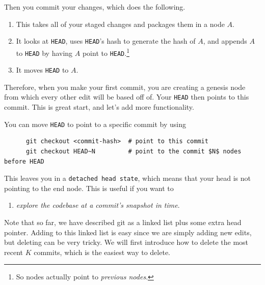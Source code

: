   \begin{definition}[Commit]
    Then you commit your changes, which does the following. 
    \begin{enumerate}
      \item This takes all of your staged changes and packages them in a node $A$. 
      \item It looks at \texttt{HEAD}, uses \texttt{HEAD}'s hash to generate the hash of $A$, and appends $A$ to \texttt{HEAD} by having $A$ point to \texttt{HEAD}.\footnote{So nodes actually point to \textit{previous nodes}.}
      \item It moves \texttt{HEAD} to $A$. 
    \end{enumerate}
  \end{definition} 

  Therefore, when you make your first commit, you are creating a genesis node from which every other edit will be based off of. Your \texttt{HEAD} then points to this commit. This is great start, and let's add more functionality. 

  \begin{definition}
    You can move \texttt{HEAD} to point to a specific commit by using 
    \begin{lstlisting}
      git checkout <commit-hash>  # point to this commit  
      git checkout HEAD~N         # point to the commit $N$ nodes before HEAD
    \end{lstlisting} 
    This leaves you in a \texttt{detached head state}, which means that your head is not pointing to the end node. This is useful if you want to 
    \begin{enumerate}
      \item \textit{explore the codebase at a commit's snapshot in time}. 
    \end{enumerate}
  \end{definition} 

  Note that so far, we have described git as a linked list plus some extra head pointer. Adding to this linked list is easy since we are simply adding new edits, but deleting can be very tricky. We will first introduce how to delete the most recent $K$ commits, which is the easiest way to delete. 


